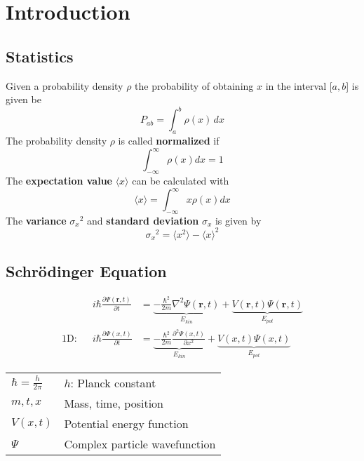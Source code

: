 \section{Introduction}
\subsection{Statistics}
Given a probability density $\rho$ the probability of obtaining $x$ in the interval [$a,b$] is given be
\begin{equation*}
    P_{ab}=\int_{a}^{b} \rho(x)\, dx
\end{equation*}
The probability density $\rho$ is called \textbf{normalized} if
\begin{equation*}
    \int_{-\infty}^{\infty}\rho(x)dx = 1
\end{equation*}
The \textbf{expectation value} $\langle x \rangle$ can be calculated with
\begin{equation*}
    \langle x \rangle = \int_{-\infty}^{\infty} x\rho(x) dx
\end{equation*}
The \textbf{variance} ${\sigma_x}^2$ and \textbf{standard deviation} $\sigma_x$ is given by
\begin{equation*}
    {\sigma_x}^2 = \langle x^2 \rangle - {\langle x \rangle }^2
\end{equation*}

\subsection{Schrödinger Equation}
\begin{align*}
               &  & i\hbar \frac{\partial \Psi(\mathbf{r},t)}{\partial t} & = \underbrace{- \frac{\hbar^2}{2m} \nabla^2 \Psi(\mathbf{r},t)}_{E_{kin}} + \underbrace{V(\mathbf{r},t)\Psi(\mathbf{r},t)}_{E_{pot}} \\
    \text{1D:} &  & i\hbar \frac{\partial \Psi(x,t)}{\partial t}          & = \underbrace{- \frac{\hbar^2}{2m} \frac{\partial^2 \Psi(x,t)}{\partial x^2}}_{E_{kin}} + \underbrace{V(x,t)\Psi(x,t)}_{E_{pot}}
\end{align*}

\renewcommand{\arraystretch}{1.3}
\setlength\tabcolsep{6pt} %
\begin{tabularx}{\linewidth}{@{}ll@{}}
    $\hbar = \frac{h}{2\pi}$ & $h$: Planck constant          \\
    $m,t,x$                  & Mass, time, position          \\
    $V(x,t)$                 & Potential energy function     \\
    $\Psi$                   & Complex particle wavefunction \\
\end{tabularx}
\renewcommand{\arraystretch}{1}
\setlength\tabcolsep{6pt} %

